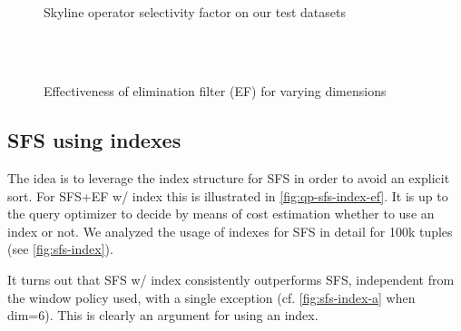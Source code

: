 \begin{figure}[htbp]
\centering%
\begin{minipage}{\onecolumnwidth}%
\\
\\
%
\end{minipage}%
\hspace{\columnsep}%
\begin{minipage}{\onecolumnwidth}%
\\
\\
%
\end{minipage}
\caption{Skyline operator selectivity factor on our test datasets}%
\label{fig:sf}%
\end{figure}


\begin{figure}[htbp]
\centering
{}\\
\\
%
\caption{Effectiveness of elimination filter (EF) for varying dimensions}%
\label{fig:ef-eff}%
\end{figure}

\subsection{SFS using indexes}
The idea is to leverage the index structure for SFS in order to avoid
an explicit sort.  For SFS+EF w/ index this is illustrated in
\autoref{fig:qp-sfs-index-ef}.  It is up to the query optimizer to
decide by means of cost estimation whether to use an index or not.  We
analyzed the usage of indexes for SFS in detail for 100k tuples (see
\autoref{fig:sfs-index}).

It turns out that SFS w/ index consistently outperforms SFS,
independent from the window policy used, with a single exception (cf.
\autoref{fig:sfs-index-a} when dim=6).  This is clearly an argument
for using an index.

